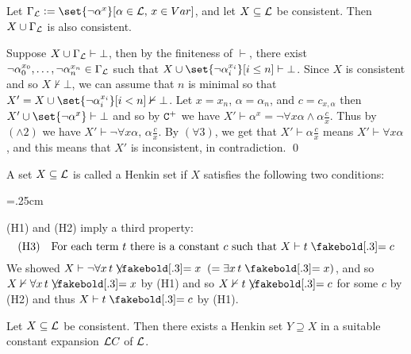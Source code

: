 \blemm

    Let $\Gamma_{\cal L}\coloneqq\set{\neg\alpha^x}[\alpha\in{\cal L},\,x\in\Var]$, and let $X\subseteq{\cal L}$ be consistent.
    Then $X\cup\Gamma_{\cal L}$ is also consistent.

\elemm

Suppose $X\cup\Gamma_{\cal L}\vdash\bot$, then by the finiteness of $\vdash$, there exist $\neg\alpha_0^{x_0},\dots,\neg\alpha_n^{x_n}\in\Gamma_{\cal L}$ such that
$X\cup\set{\neg\alpha_i^{x_i}}[i\leq n]\vdash\bot$.
Since $X$ is consistent and so $X\nvdash\bot$, we can assume that $n$ is minimal so that $X'=X\cup\set{\neg\alpha_i^{x_i}}[i<n]\nvdash\bot$.
Let $x=x_n$, $\alpha=\alpha_n$, and $c=c_{x,\alpha}$ then $X'\cup\set{\neg\alpha^x}\vdash\bot$ and so by ${\tt C}^+$ we have $X'\vdash\alpha^x=\neg\forall x\alpha\land\alpha\frac cx$.
Thus by $(\land2)$ we have $X'\vdash\neg\forall x\alpha,\,\alpha\frac cx$.
By $(\forall3)$, we get that $X'\vdash\alpha\frac cx$ means $X'\vdash\forall x\alpha$, and this means that $X'$ is inconsistent, in contradiction.
\qed

\bdefn

    A set $X\subseteq{\cal L}$ is called a {\emphcolor Henkin set} if $X$ satisfies the following two conditions:

    \medskip
    \tabskip=.25cm
    {\jot{}}

\edefn

(H1) and (H2) imply a third property:
$$ \hbox{(H3)}\quad\hbox{For each term $t$ there is a constant $c$ such that $X\vdash t\eq c$} $$
We showed $X\vdash\neg\forall x\,t\neqb x\mathrel{}(=\exists x\,t\eq x)$, and so $X\nvdash\forall x\,t\neqb x$ by (H1) and so $X\nvdash t\neqb c$ for some $c$ by (H2) and thus $X\vdash t\eq c$ by (H1).

\blemm

    Let $X\subseteq{\cal L}$ be consistent.
    Then there exists a Henkin set $Y\supseteq X$ in a suitable constant expansion ${\cal L}C$ of ${\cal L}$.

\elemm

